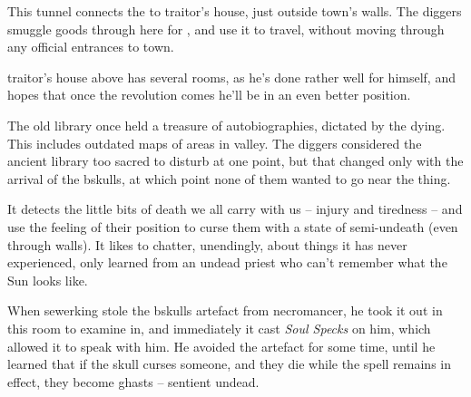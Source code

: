 

This tunnel connects the  to \gls{traitor}'s house, just outside \gls{town}'s walls.
The \glspl{digger} smuggle goods through here for , and use it to travel, without moving through any official entrances to \gls{town}.

\Gls{traitor}'s house above has several rooms, as he's done rather well for himself, and hopes that once the revolution comes he'll be in an even better position.


\begin{exampletext}
  The old library once held a treasure of autobiographies, dictated by the dying.
  This includes outdated maps of areas in \gls{valley}.
  The \glspl{digger} considered the ancient library too sacred to disturb at one point, but that changed only with the arrival of the \gls{bskulls}, at which point none of them wanted to go near the thing.

  It detects the little bits of death we all carry with us -- injury and tiredness -- and use the feeling of their position to curse them with a state of semi-undeath (even through walls).
  It likes to chatter, unendingly, about things it has never experienced, only learned from an undead priest who can't remember what the Sun looks like.

  When \gls{sewerking} stole the \gls{bskulls} \gls{artefact} from \gls{necromancer}, he took it out in this room to examine in, and immediately it cast \textit{Soul Specks} on him, which allowed it to speak with him.
  He avoided the \gls{artefact} for some time, until he learned that if the skull curses someone, and they die while the spell remains in effect, they become ghasts -- sentient undead.%

\end{exampletext}


